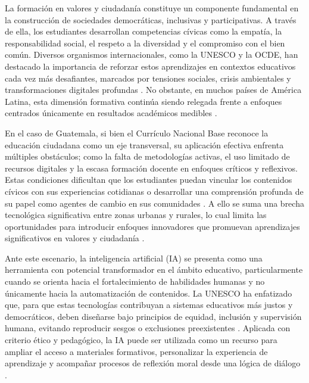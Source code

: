 La formación en valores y ciudadanía constituye un componente fundamental en la construcción de sociedades democráticas, inclusivas y participativas. A través de ella, los estudiantes desarrollan competencias cívicas como la empatía, la responsabilidad social, el respeto a la diversidad y el compromiso con el bien común. Diversos organismos internacionales, como la UNESCO y la OCDE, han destacado la importancia de reforzar estos aprendizajes en contextos educativos cada vez más desafiantes, marcados por tensiones sociales, crisis ambientales y transformaciones digitales profundas \cite{unesco2021ethics,oecd2021skills}. No obstante, en muchos países de América Latina, esta dimensión formativa continúa siendo relegada frente a enfoques centrados únicamente en resultados académicos medibles \cite{worldbank2022revolution,rivas2023future}.

En el caso de Guatemala, si bien el Currículo Nacional Base reconoce la educación ciudadana como un eje transversal, su aplicación efectiva enfrenta múltiples obstáculos; como la falta de metodologías activas, el uso limitado de recursos digitales y la escasa formación docente en enfoques críticos y reflexivos. Estas condiciones dificultan que los estudiantes puedan vincular los contenidos cívicos con sus experiencias cotidianas o desarrollar una comprensión profunda de su papel como agentes de cambio en sus comunidades \cite{mineduc2020cnb,cien2019diagnostico}. A ello se suma una brecha tecnológica significativa entre zonas urbanas y rurales, lo cual limita las oportunidades para introducir enfoques innovadores que promuevan aprendizajes significativos en valores y ciudadanía \cite{unesco2023monitoring,levy2025teachers}.

Ante este escenario, la inteligencia artificial (IA) se presenta como una herramienta con potencial transformador en el ámbito educativo, particularmente cuando se orienta hacia el fortalecimiento de habilidades humanas y no únicamente hacia la automatización de contenidos. La UNESCO ha enfatizado que, para que estas tecnologías contribuyan a sistemas educativos más justos y democráticos, deben diseñarse bajo principios de equidad, inclusión y supervisión humana, evitando reproducir sesgos o exclusiones preexistentes \cite{unesco2021ethics,unesco2021guidance}. Aplicada con criterio ético y pedagógico, la IA puede ser utilizada como un recurso para ampliar el acceso a materiales formativos, personalizar la experiencia de aprendizaje y acompañar procesos de reflexión moral desde una lógica de diálogo \cite{frontiers2024chatgpt,tulsiani2024chatgpt}.


